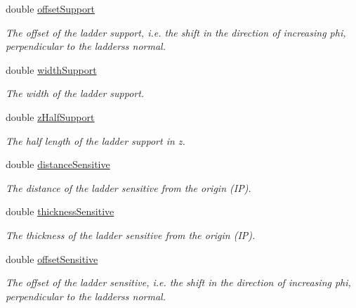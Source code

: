 \begin{DoxyCompactItemize}
double \hyperlink{struct_d_d4hep_1_1_d_d_rec_1_1_z_planar_struct_1_1_layer_layout_ae19dff80b6c19640638709b1030f966e}{offset\+Support}
\begin{DoxyCompactList}\small\item\em The offset of the ladder support, i.\+e. the shift in the direction of increasing phi, perpendicular to the ladders\textquotesingle{}s normal. \end{DoxyCompactList}\item 
double \hyperlink{struct_d_d4hep_1_1_d_d_rec_1_1_z_planar_struct_1_1_layer_layout_a424a9c4bbadfd8837f8f470ae48b2c61}{width\+Support}
\begin{DoxyCompactList}\small\item\em The width of the ladder support. \end{DoxyCompactList}\item 
double \hyperlink{struct_d_d4hep_1_1_d_d_rec_1_1_z_planar_struct_1_1_layer_layout_abc36f1593bf58e3ccae337babd8be4d5}{z\+Half\+Support}
\begin{DoxyCompactList}\small\item\em The half length of the ladder support in z. \end{DoxyCompactList}\item 
double \hyperlink{struct_d_d4hep_1_1_d_d_rec_1_1_z_planar_struct_1_1_layer_layout_a3bff9db37d2d2cb49055c2bd59c69ebd}{distance\+Sensitive}
\begin{DoxyCompactList}\small\item\em The distance of the ladder sensitive from the origin (IP). \end{DoxyCompactList}\item 
double \hyperlink{struct_d_d4hep_1_1_d_d_rec_1_1_z_planar_struct_1_1_layer_layout_a892de05e4a65f7fcd96493f7e24f060d}{thickness\+Sensitive}
\begin{DoxyCompactList}\small\item\em The thickness of the ladder sensitive from the origin (IP). \end{DoxyCompactList}\item 
double \hyperlink{struct_d_d4hep_1_1_d_d_rec_1_1_z_planar_struct_1_1_layer_layout_a80e60caf98db3f296a3d995e77c3f8c6}{offset\+Sensitive}
\begin{DoxyCompactList}\small\item\em The offset of the ladder sensitive, i.\+e. the shift in the direction of increasing phi, perpendicular to the ladders\textquotesingle{}s normal. \end{DoxyCompactList}\item 

\end{DoxyCompactItemize}
